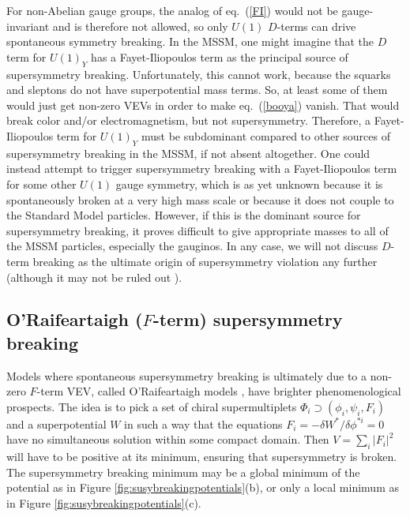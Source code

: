 \documentclass[11pt]{article}
\begin{document}
For non-Abelian gauge groups, the analog of eq.~(\ref{FI}) would not be
gauge-invariant and is therefore not allowed, so only $U(1)$ $D$-terms can
drive spontaneous symmetry breaking. In the MSSM, one might imagine that
the $D$ term for $U(1)_Y$ has a Fayet-Iliopoulos term as the principal
source of supersymmetry breaking. Unfortunately, this cannot work, because
the squarks and sleptons do not have superpotential mass terms. So, at
least some of them would just get non-zero VEVs in order to make
eq.~(\ref{booya}) vanish. That would break color and/or electromagnetism,
but not supersymmetry. Therefore, a Fayet-Iliopoulos term for $U(1)_Y$
must be subdominant compared to other sources of supersymmetry breaking in
the MSSM, if not absent altogether. One could instead attempt to trigger
supersymmetry breaking with a Fayet-Iliopoulos term for some other $U(1)$
gauge symmetry, which is as yet unknown because it is spontaneously broken
at a very high mass scale or because it does not couple to the Standard
Model particles. However, if this is the dominant source for supersymmetry
breaking, it proves difficult to give appropriate masses to all of the
MSSM particles, especially the gauginos. In any case, we will not discuss
$D$-term breaking as the ultimate origin of supersymmetry violation any
further (although it may not be ruled out \cite{dtermbreakingmaywork}).

\subsection{O'Raifeartaigh ($F$-term) supersymmetry breaking
\label{subsec:origins.Fterm}}
\setcounter{equation}{0}
\setcounter{footnote}{1}

Models where spontaneous supersymmetry breaking is ultimately due to a
non-zero $F$-term VEV, called O'Rai\-f\-ear\-taigh models
\cite{ORaifeartaigh}, have brighter phenomenological prospects. The idea
is to pick a set of chiral supermultiplets $\Phi_i\supset (\phi_i, \psi_i,
F_i)$ and a superpotential $W$ in such a way that the equations $F_i =
-\delta W^*/\delta \phi^{*i} = 0$ have no simultaneous solution within some
compact domain. Then
$V=\sum_i |F_i|^2$ will have to be positive at its minimum, ensuring that
supersymmetry is broken. The supersymmetry breaking minimum may be 
a global minimum of the potential as in Figure \ref{fig:susybreakingpotentials}(b), or only
a local minimum as in Figure \ref{fig:susybreakingpotentials}(c).
\end{document}
